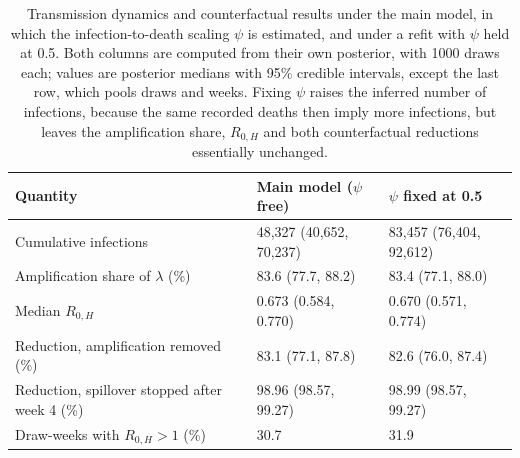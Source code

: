 \begin{table}[htbp]
\centering
\caption{Transmission dynamics and counterfactual results under the main model, in which the infection-to-death scaling $\psi$ is estimated, and under a refit with $\psi$ held at 0.5. Both columns are computed from their own posterior, with 1000 draws each; values are posterior medians with 95\% credible intervals, except the last row, which pools draws and weeks. Fixing $\psi$ raises the inferred number of infections, because the same recorded deaths then imply more infections, but leaves the amplification share, $R_{0,H}$ and both counterfactual reductions essentially unchanged.}
\label{tab:si_psi_fixed_dynamics}
\begin{tabularx}{\textwidth}{Xll}
\toprule
Quantity & Main model ($\psi$ free) & $\psi$ fixed at 0.5 \\
\midrule
Cumulative infections & 48,327 (40,652, 70,237) & 83,457 (76,404, 92,612) \\
Amplification share of $\lambda$ (\%) & 83.6 (77.7, 88.2) & 83.4 (77.1, 88.0) \\
Median $R_{0,H}$ & 0.673 (0.584, 0.770) & 0.670 (0.571, 0.774) \\
Reduction, amplification removed (\%) & 83.1 (77.1, 87.8) & 82.6 (76.0, 87.4) \\
Reduction, spillover stopped after week 4 (\%) & 98.96 (98.57, 99.27) & 98.99 (98.57, 99.27) \\
Draw-weeks with $R_{0,H} > 1$ (\%) & 30.7 & 31.9 \\
\bottomrule
\end{tabularx}
\end{table}
